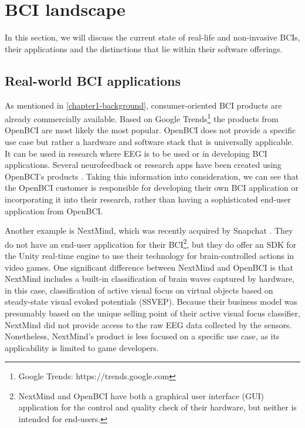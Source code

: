 \section{BCI landscape}
\label{chapter2-research-landscape}

In this section, we will discuss the current state of real-life and non-invasive BCIs, their applications and the distinctions that lie within their software offerings.

\subsection{Real-world BCI applications}
\label{chapter2-real-world-bci-applications}

As mentioned in \autoref{chapter1-background}, consumer-oriented BCI products are already commercially available. Based on Google Trends\footnote{Google Trends: https://trends.google.com} the products from OpenBCI are most likely the most popular. OpenBCI does not provide a specific use case but rather a hardware and software stack that is universally applicable. It can be used in research where EEG is to be used or in developing BCI applications. Several neurofeedback or research apps have been created using OpenBCI's products \citep{openbci_openbci_nodate}. Taking this information into consideration, we can see that the OpenBCI customer is responsible for developing their own BCI application or incorporating it into their research, rather than having a sophisticated end-user application from OpenBCI.

Another example is NextMind, which was recently acquired by Snapchat \citep{heater_snap_2022}. They do not have an end-user application for their BCI\footnote{NextMind and OpenBCI have both a graphical user interface (GUI) application for the control and quality check of their hardware, but neither is intended for end-users.}, but they do offer an SDK for the Unity real-time engine to use their technology for brain-controlled actions in video games. One significant difference between NextMind and OpenBCI is that NextMind includes a built-in classification of brain waves captured by hardware, in this case, classification of active visual focus on virtual objects based on steady-state visual evoked potentials (SSVEP). Because their business model was presumably based on the unique selling point of their active visual focus classifier, NextMind did not provide access to the raw EEG data collected by the sensors. Nonetheless, NextMind's product is less focused on a specific use case, as its applicability is limited to game developers.

